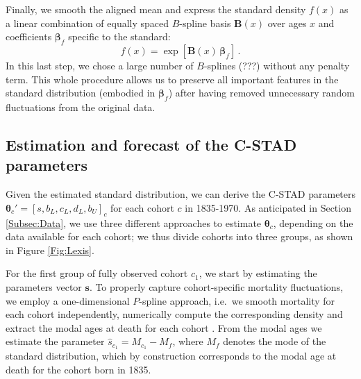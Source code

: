\documentclass[11pt, a4paper]{article}
\begin{document}
Finally, we smooth the aligned mean and express the standard density $f(x)$ as a linear combination of equally spaced $B$-spline basis $\bm{B}(x)$ over ages $x$ and coefficients $\bm{\beta}_{f}$ specific to the standard:
%
\begin{equation}\label{Eq:standPsplines}
f(x) = \exp\left[ \bm{B}(x) \, \bm{\beta}_{f} \right] \, .
\end{equation}
In this last step, we chose a large number of $B$-splines (???) without any penalty term. This whole procedure allows us to preserve all important features in the standard distribution (embodied in $\bm{\beta}_{f}$) after having removed unnecessary random fluctuations from the original data.


\subsection{Estimation and forecast of the C-STAD parameters}
\label{Subsec:EstimForeC-STAD}
Given the estimated standard distribution, we can derive the C-STAD parameters $\bm{\theta}_{c}'=\left[s,b_{L},c_{L},d_{L},b_{U}\right]_{c}$ for each cohort $c$ in 1835-1970. As anticipated in Section \ref{Subsec:Data}, we use three different approaches to estimate $\bm{\theta}_{c}$, depending on the data available for each cohort; we thus divide cohorts into three groups, as shown in Figure \ref{Fig:Lexis}. 

For the first group of fully observed cohort $c_1$, we start by estimating the parameters vector $\bm{s}$. To properly capture cohort-specific mortality fluctuations, we employ a one-dimensional $P$-spline approach, i.e.~we smooth mortality for each cohort independently, numerically compute the corresponding density and extract the modal ages at death for each cohort \citep[for a similar approach in a period perspective see][]{ouellette2011changes}. From the modal ages we estimate the parameter $\hat{s}_{c_{1}}=M_{c_{1}} - M_f$, where $M_f$ denotes the mode of the standard distribution, which by construction corresponds to the modal age at death for the cohort born in 1835. \par
\end{document}
